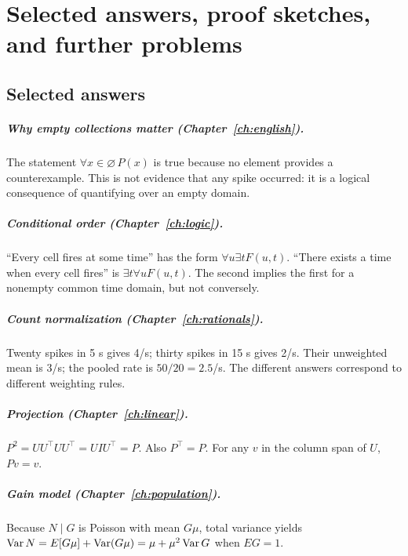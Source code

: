 \chapter{Selected answers, proof sketches, and further problems}
\section{Selected answers}
\paragraph{Why empty collections matter (Chapter~\ref{ch:english}).} The statement $\forall x\in\varnothing\,P(x)$ is true because no element provides a counterexample. This is not evidence that any spike occurred: it is a logical consequence of quantifying over an empty domain.
\paragraph{Conditional order (Chapter~\ref{ch:logic}).} ``Every cell fires at some time'' has the form $\forall u\exists tF(u,t)$. ``There exists a time when every cell fires'' is $\exists t\forall uF(u,t)$. The second implies the first for a nonempty common time domain, but not conversely.
\paragraph{Count normalization (Chapter~\ref{ch:rationals}).} Twenty spikes in 5 s gives 4/s; thirty spikes in 15 s gives 2/s. Their unweighted mean is 3/s; the pooled rate is $50/20=2.5$/s. The different answers correspond to different weighting rules.
\paragraph{Projection (Chapter~\ref{ch:linear}).} $P^2=UU^\top UU^\top=U I U^\top=P$. Also $P^\top=P$. For any $v$ in the column span of $U$, $Pv=v$.
\paragraph{Gain model (Chapter~\ref{ch:population}).} Because $N\mid G$ is Poisson with mean $G\mu$, total variance yields $\operatorname{Var} N=E[G\mu]+\operatorname{Var}(G\mu)=\mu+\mu^2\operatorname{Var} G$ when $E G=1$.
